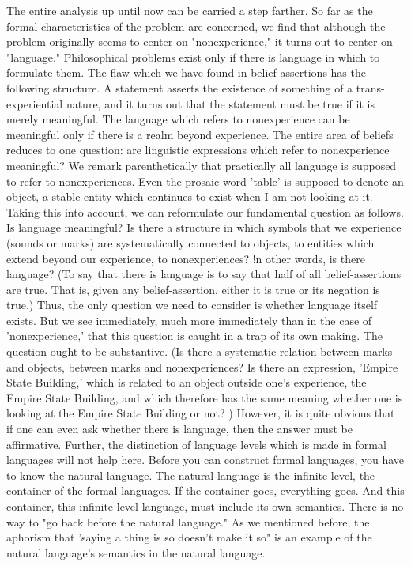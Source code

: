 \documentclass[10pt,twoside]{memoir}
\begin{document}
The entire analysis up until now can be carried a step farther. So far as 
the formal characteristics of the problem are concerned, we find that 
although the problem originally seems to center on "nonexperience," it 
turns out to center on "language." Philosophical problems exist only if there 
is language in which to formulate them. The flaw which we have found in 
belief-assertions has the following structure. A statement asserts the 
existence of something of a trans-experiential nature, and it turns out that 
the statement must be true if it is merely meaningful. The language which 
refers to nonexperience can be meaningful only if there is a realm beyond 
experience. The entire area of beliefs reduces to one question: are linguistic 
expressions which refer to nonexperience meaningful? We remark 
parenthetically that practically all language is supposed to refer to 
nonexperiences. Even the prosaic word 'table' is supposed to denote an 
object, a stable entity which continues to exist when I am not looking at it. 
Taking this into account, we can reformulate our fundamental question as 
follows. Is language meaningful? Is there a structure in which symbols that 
we experience (sounds or marks) are systematically connected to objects, to 
entities which extend beyond our experience, to nonexperiences? !n other 
words, is there language? (To say that there is language is to say that half of 
all belief-assertions are true. That is, given any belief-assertion, either it is 
true or its negation is true.) Thus, the only question we need to consider is 
whether language itself exists. But we see immediately, much more 
immediately than in the case of 'nonexperience,' that this question is 
caught in a trap of its own making. The question ought to be substantive. (Is 
there a systematic relation between marks and objects, between marks and 
nonexperiences? Is there an expression, 'Empire State Building,' which is 
related to an object outside one's experience, the Empire State Building, and 
which therefore has the same meaning whether one is looking at the Empire 
State Building or not? ) However, it is quite obvious that if one can even ask 
whether there is language, then the answer must be affirmative. Further, the 
distinction of language levels which is made in formal languages will not help 
here. Before you can construct formal languages, you have to know the 
natural language. The natural language is the infinite level, the container of 
the formal languages. If the container goes, everything goes. And this 
container, this infinite level language, must include its own semantics. There 
is no way to "go back before the natural language." As we mentioned 
before, the aphorism that 'saying a thing is so doesn't make it so" is an 
example of the natural language's semantics in the natural language. 
\end{document}
